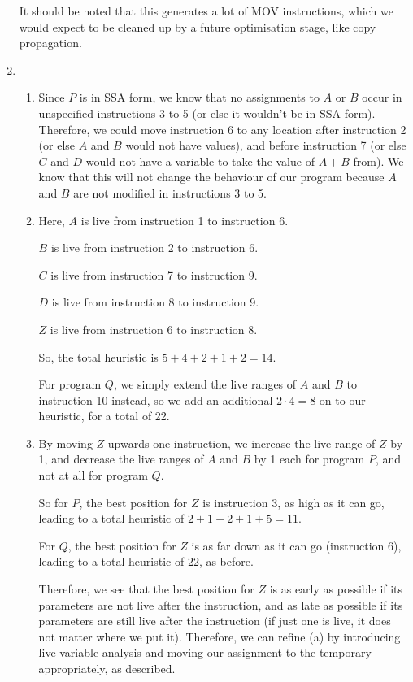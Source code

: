 \begin{enumerate}[label=(\alph*)]
It should be noted that this generates a lot of MOV instructions, which we would expect to be cleaned up by a future optimisation stage, like copy propagation.

\item
  \begin{enumerate}[label=(\roman*)]

    \item
      Since $P$ is in SSA form, we know that no assignments to $A$ or $B$ occur in unspecified instructions 3 to 5 (or else it wouldn't be in SSA form). Therefore, we could move instruction 6 to any location after instruction 2 (or else $A$ and $B$ would not have values), and before instruction 7 (or else $C$ and $D$ would not have a variable to take the value of $A+B$ from). We know that this will not change the behaviour of our program because $A$ and $B$ are not modified in instructions 3 to 5.

    \item
      Here, $A$ is live from instruction 1 to instruction 6.

      $B$ is live from instruction 2 to instruction 6.

      $C$ is live from instruction 7 to instruction 9.

      $D$ is live from instruction 8 to instruction 9.

      $Z$ is live from instruction 6 to instruction 8.

      So, the total heuristic is $5 + 4 + 2 + 1 + 2 = 14$.

      For program $Q$, we simply extend the live ranges of $A$ and $B$ to instruction 10 instead, so we add an additional $2 \cdot 4 = 8$ on to our heuristic, for a total of 22.

    \item
      By moving $Z$ upwards one instruction, we increase the live range of $Z$ by 1, and decrease the live ranges of $A$ and $B$ by 1 each for program $P$, and not at all for program $Q$.

      So for $P$, the best position for $Z$ is instruction 3, as high as it can go, leading to a total heuristic of $2 + 1 + 2 + 1 + 5 = 11$.

      For $Q$, the best position for $Z$ is as far down as it can go (instruction 6), leading to a total heuristic of 22, as before.

      Therefore, we see that the best position for $Z$ is as early as possible if its parameters are not live after the instruction, and as late as possible if its parameters are still live after the instruction (if just one is live, it does not matter where we put it). Therefore, we can refine (a) by introducing live variable analysis and moving our assignment to the temporary appropriately, as described.

      
  \end{enumerate}

        
    \end{enumerate}

